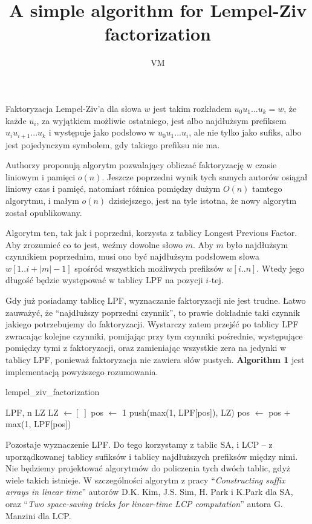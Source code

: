 \documentclass[a4paper,12pt]{article}
\title{A simple algorithm for Lempel-Ziv factorization}
\author{VM}
\theoremstyle{definition}
\begin{document}
\maketitle

Faktoryzacja Lempel-Ziv'a dla słowa $w$ jest takim rozkładem $u_0 u_1 ... u_k = w$,
 że każde $u_i$, za wyjątkiem możliwie ostatniego,
 jest albo najdłużsym prefiksem $u_i u_{i + 1} ... u_k$ i występuje jako podsłowo w $u_0 u_1 ... u_i$,
 ale nie tylko jako sufiks,
 albo jest pojedynczym symbolem, gdy takiego prefiksu nie ma.

Authorzy proponują algorytm pozwalający obliczać faktoryzację w czasie liniowym i pamięci $o(n)$.
Jeszcze poprzedni wynik tych samych autorów osiągał liniowy czas i pamięć,
 natomiast różnica pomiędzy dużym $O(n)$ tamtego algorytmu, i małym $o(n)$ dzisiejszego, jest na tyle istotna,
 że nowy algorytm został opublikowany.

Algorytm ten, tak jak i poprzedni, korzysta z tablicy Longest Previous Factor.
Aby zrozumieć co to jest, weźmy dowolne słowo $m$.
Aby $m$ było najdłużsym czynnikiem poprzednim,
 musi ono być najdłużsym podsłowem słowa $w[1..i + |m| - 1]$ spośród wszystkich możliwych prefiksów $w[i..n]$.
Wtedy jego długość będzie występować w tablicy LPF na pozycji $i$-tej.

Gdy już posiadamy tablicę LPF, wyznaczanie faktoryzacji nie jest trudne.
Łatwo zauważyć, że ``najdłuższy poprzedni czynnik'', to prawie dokładnie taki czynnik jakiego potrzebujemy do faktoryzacji.
Wystarczy zatem przejść po tablicy LPF zwracając kolejne czynniki,
 pomijając przy tym czynniki pośrednie, występujące pomiędzy tymi z faktoryzacji,
 oraz zamieniając wszystkie zera na jedynki w tablicy LPF, ponieważ faktoryzacja nie zawiera słów pustych.
\textbf{Algorithm 1} jest implementacją powyższego rozumowania.

\begin{algorithm}
\caption{lempel\_ziv\_factorization}
\begin{algorithmic}
\REQUIRE LPF, n
\ENSURE LZ
\STATE LZ $\gets [\;]$
\STATE pos $\gets$ 1
\STATE push(max(1, LPF[pos]), LZ)
\STATE pos $\gets$ pos + max(1, LPF[pos])
\ENDWHILE
\end{algorithmic}
\end{algorithm}

Pozostaje wyznaczenie LPF. Do tego korzystamy z tablic SA, i LCP --
 z uporządkowanej tablicy sufiksów i tablicy najdłuższych prefiksów między nimi.
Nie będziemy projektować algorytmów do policzenia tych dwóch tablic,
 gdyż wiele takich istnieje.
W szczególności algorytm 
 z pracy ``\textit{Constructing suffix arrays in linear time}'' autorów D.K. Kim, J.S. Sim, H. Park i K.Park dla SA,
 oraz ``\textit{Two space-saving tricks for linear-time LCP computation}'' autora G. Manzini dla LCP.
\end{document}
